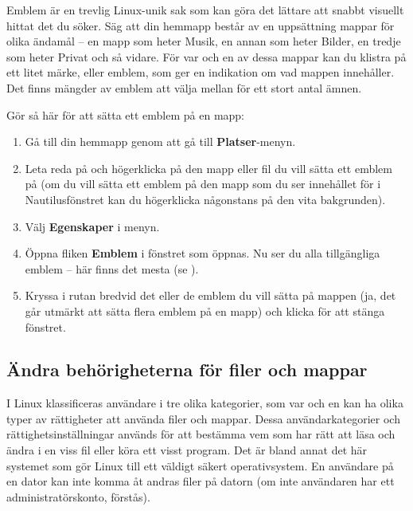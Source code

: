 \documentclass[a4paper,final]{memoir} %
\begin{document}

Emblem är en trevlig Linux-unik sak som kan göra det lättare att snabbt visuellt hittat det du söker. Säg att din hemmapp består av en uppsättning mappar för olika ändamål -- en mapp som heter Musik, en annan som heter Bilder, en tredje som heter Privat och så vidare. För var och en av dessa mappar kan du klistra på ett litet märke, eller emblem, som ger en indikation om vad mappen innehåller. Det finns mängder av emblem att välja mellan för ett stort antal ämnen. 


Gör så här för att sätta ett emblem på en mapp:

\begin{enumerate}

\item Gå till din hemmapp genom att gå till \textbf{Platser}-menyn.
\item Leta reda på och högerklicka på den mapp eller fil du vill sätta ett emblem på (om du vill sätta ett emblem på den mapp som du ser innehållet för i Nautilusfönstret kan du högerklicka någonstans på den vita bakgrunden).
\item Välj \textbf{Egenskaper} i menyn. 
\item Öppna fliken \textbf{Emblem} i fönstret som öppnas. Nu ser du alla tillgängliga emblem -- här finns det mesta (se ). 
\item Kryssa i rutan bredvid det eller de emblem du vill sätta på mappen (ja, det går utmärkt att sätta flera emblem på en mapp) och klicka \xstang{} för att stänga fönstret.

\end{enumerate}



\subsection{Ändra behörigheterna för filer och mappar}


I Linux klassificeras användare i tre olika kategorier, som var och en kan ha olika typer av rättigheter att använda filer och mappar. Dessa användarkategorier och rättighetsinställningar används för att bestämma vem som har rätt att läsa och ändra i en viss fil eller köra ett visst program. Det är bland annat det här systemet som gör Linux till ett väldigt säkert operativsystem. En användare på en dator kan inte komma åt andras filer på datorn (om inte användaren har ett administratörskonto, förstås).
\end{document}

